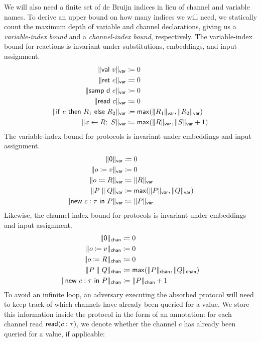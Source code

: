 \noindent We will also need a finite set of de Bruijn indices in lieu of channel and variable names. To derive an upper bound on how many indices we will need, we statically count the maximum depth of variable and channel declarations, giving us a \emph{variable-index bound} and a \emph{channel-index bound}, respectively. The variable-index bound for reactions is invariant under substitutions, embeddings, and input assignment.
\begin{align*}
\Vert \mathsf{val} \ v \Vert_{\mathsf{var}} & \coloneqq 0 \\
\Vert \mathsf{ret} \ e \Vert_{\mathsf{var}} & \coloneqq 0 \\
\Vert \mathsf{samp} \ \mathsf{d} \ e \Vert_{\mathsf{var}} & \coloneqq 0 \\
\Vert \mathsf{read} \ c \Vert_{\mathsf{var}} & \coloneqq 0 \\
\Vert \mathsf{if} \ e \ \mathsf{then} \ R_1 \ \mathsf{else} \ R_2 \Vert_{\mathsf{var}} & \coloneqq \mathsf{max}(\Vert R_1 \Vert_{\mathsf{var}}, \Vert R_2 \Vert_{\mathsf{var}}) \\
\Vert x \leftarrow R; \ S \Vert_{\mathsf{var}} & \coloneqq \mathsf{max}(\Vert R \Vert_{\mathsf{var}}, \Vert S \Vert_{\mathsf{var}} + 1)
\end{align*}
The variable-index bound for protocols is invariant under embeddings and input assignment.
\begin{align*}
\Vert \mathsf{0} \Vert_{\mathsf{var}} & \coloneqq 0 \\
\Vert o \coloneqq v \Vert_{\mathsf{var}} & \coloneqq 0 \\
\Vert o \coloneqq R \Vert_{\mathsf{var}} & \coloneqq \Vert R \Vert_{\mathsf{var}} \\
\Vert P \; \| \; Q \Vert_{\mathsf{var}} & \coloneqq \mathsf{max}(\Vert P \Vert_{\mathsf{var}}, \Vert Q \Vert_{\mathsf{var}}) \\
\Vert \mathsf{new} \ c : \tau \ \mathsf{in} \ P \Vert_{\mathsf{var}} & \coloneqq \Vert P \Vert_{\mathsf{var}}
\end{align*}
Likewise, the channel-index bound for protocols is invariant under embeddings and input assignment.
\begin{align*}
\Vert \mathsf{0} \Vert_{\mathsf{chan}} & \coloneqq 0 \\
\Vert o \coloneqq v \Vert_{\mathsf{chan}} & \coloneqq 0 \\
\Vert o \coloneqq R \Vert_{\mathsf{chan}} & \coloneqq 0 \\
\Vert P \; \| \; Q \Vert_{\mathsf{chan}} & \coloneqq \mathsf{max}(\Vert P \Vert_{\mathsf{chan}}, \Vert Q \Vert_{\mathsf{chan}}) \\
\Vert \mathsf{new} \ c : \tau \ \mathsf{in} \ P \Vert_{\mathsf{chan}} & \coloneqq \Vert P \Vert_{\mathsf{chan}} + 1
\end{align*}
To avoid an infinite loop, an adversary executing the absorbed protocol will need to keep track of which channels have already been queried for a value. We store this information inside the protocol in the form of an annotation: for each channel read $\mathsf{read}(c : \tau)$, we denote whether the channel $c$ has already been queried for a value, if applicable:

\begin{syntax}

    \alternative{\ldots}
    \alternative{\ldots}

	  \alternative{\ldots}	
	  \alternative{\ldots}
\end{syntax}

